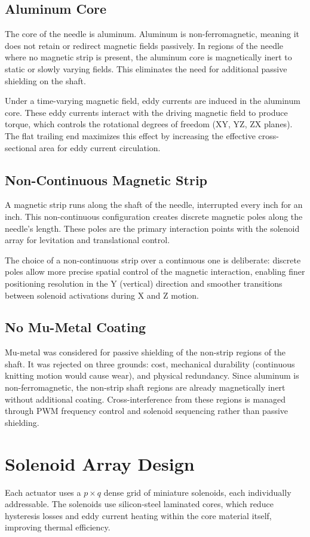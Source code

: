 \documentclass[10pt]{article}
\begin{document}
\subsection{Aluminum Core}
The core of the needle is aluminum. Aluminum is non-ferromagnetic, meaning it does not retain or redirect magnetic fields passively. In regions of the needle where no magnetic strip is present, the aluminum core is magnetically inert to static or slowly varying fields. This eliminates the need for additional passive shielding on the shaft.

Under a time-varying magnetic field, eddy currents are induced in the aluminum core. These eddy currents interact with the driving magnetic field to produce torque, which controls the rotational degrees of freedom (XY, YZ, ZX planes). The flat trailing end maximizes this effect by increasing the effective cross-sectional area for eddy current circulation.

\subsection{Non-Continuous Magnetic Strip}
A magnetic strip runs along the shaft of the needle, interrupted every inch for an inch. This non-continuous configuration creates discrete magnetic poles along the needle's length. These poles are the primary interaction points with the solenoid array for levitation and translational control.

The choice of a non-continuous strip over a continuous one is deliberate: discrete poles allow more precise spatial control of the magnetic interaction, enabling finer positioning resolution in the Y (vertical) direction and smoother transitions between solenoid activations during X and Z motion.

\subsection{No Mu-Metal Coating}
Mu-metal was considered for passive shielding of the non-strip regions of the shaft. It was rejected on three grounds: cost, mechanical durability (continuous knitting motion would cause wear), and physical redundancy. Since aluminum is non-ferromagnetic, the non-strip shaft regions are already magnetically inert without additional coating. Cross-interference from these regions is managed through PWM frequency control and solenoid sequencing rather than passive shielding.

\section{Solenoid Array Design}
Each actuator uses a $p\times q$ dense grid of miniature solenoids, each individually addressable. The solenoids use silicon-steel laminated cores, which reduce hysteresis losses and eddy current heating within the core material itself, improving thermal efficiency.
\end{document}

